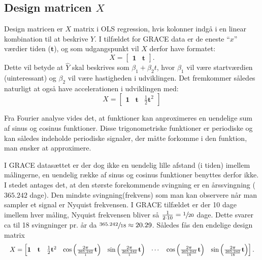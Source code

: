 \subsection{Design matricen $X$}
Design matricen er $X$ matrix i OLS regression, hvis kolonner indgå i en linear kombination til at beskrive $Y$.
I tilfældet for GRACE data er de eneste ``$x$'' værdier tiden ($\mathbf{t}$), og som udgangspunkt vil $X$ derfor have formatet:
\begin{equation}
X = \left[\begin{matrix} \mathbf{1} & \mathbf{t} \end{matrix}\right].
\end{equation} 
Dette vil betyde at $\hat{Y}$ skal beskrives som $\beta_1 + \beta_2 t$, hvor $\beta_1$ vil være startværdien (uinteressant) og $\beta_2$ vil være hastigheden i udviklingen.
Det fremkommer således naturligt at også have accelerationen i udviklingen med:
\begin{equation}
X = \left[\begin{matrix} \mathbf{1} & \mathbf{t} & \frac{1}{2} \mathbf{t}^2 \end{matrix}\right]
\end{equation} 

Fra Fourier analyse vides det, at funktioner kan anproximeres en uendelige sum af sinus og cosinus funktioner.
Disse trigonometriske funktioner er periodiske og kan således indeholde periodiske signaler, der måtte forkomme i den funktion, man ønsker at approximere.

I GRACE datasættet er der dog ikke en uendelig lille afstand (i tiden) imellem målingerne, en uendelig række af sinus og cosinus funktioner benyttes derfor ikke.
I stedet antages det, at den største forekommende svingning er en årssvingning ($365.242$ dage).
Den mindste svingning(frekvens) som man kan observere når man sampler et signal er Nyquist frekvensen.
I GRACE tilfældet er der 10 dage imellem hver måling, Nyquist frekvensen bliver så $\frac{1}{2 \cdot 10} = \sfrac{1}{20}$ dage.
Dette svarer ca til 18 svingninger pr. år da $\sfrac{365.242}{18} \approx 20.29$. Således fås den endelige design matrix
\begin{equation*}
\resizebox{\textwidth}{!}{$
X = \left[\begin{matrix}
	\mathbf{1} &
	\mathbf{t} &
	\frac{1}{2} \mathbf{t}^2 &
	\cos\left( \frac{2 \pi}{\frac{365.242}{1}} \mathbf{t} \right) &
	\sin\left( \frac{2 \pi}{\frac{365.242}{1}} \mathbf{t} \right) &
	\cdots &
	\cos\left( \frac{2 \pi}{\frac{365.242}{18}} \mathbf{t} \right) &
	\sin\left( \frac{2 \pi}{\frac{365.242}{18}} \mathbf{t} \right)
\end{matrix}\right].
$}
\end{equation*}

